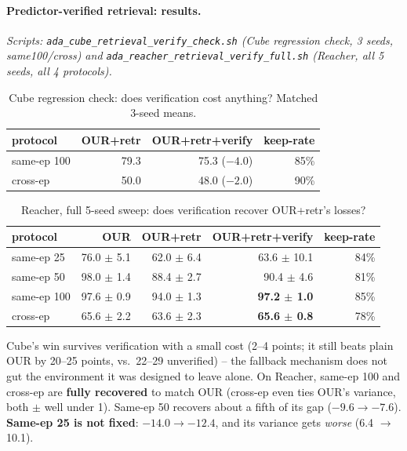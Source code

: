 \documentclass[11pt]{article}
\begin{document}
\paragraph{Predictor-verified retrieval: results.} \emph{Scripts:
\texttt{ada\_cube\_retrieval\_verify\_check.sh} (Cube regression check, 3 seeds, same100/cross)
and \texttt{ada\_reacher\_retrieval\_verify\_full.sh} (Reacher, all 5 seeds, all 4 protocols).}

\begin{table}[H]
\centering\small
\caption{Cube regression check: does verification cost anything? Matched 3-seed means.}
\begin{tabular}{lrrr}
\toprule
protocol & OUR+retr & OUR+retr+verify & keep-rate \\
\midrule
same-ep 100 & 79.3 & 75.3 ($-4.0$) & 85\% \\
cross-ep    & 50.0 & 48.0 ($-2.0$) & 90\% \\
\bottomrule
\end{tabular}
\end{table}

\begin{table}[H]
\centering\small
\caption{Reacher, full 5-seed sweep: does verification recover OUR+retr's losses?}
\label{tab:retrieval-verify-reacher}
\begin{tabular}{lrrrr}
\toprule
protocol & OUR & OUR+retr & OUR+retr+verify & keep-rate \\
\midrule
same-ep 25  & 76.0 $\pm$ 5.1 & 62.0 $\pm$ 6.4 & 63.6 $\pm$ 10.1 & 84\% \\
same-ep 50  & 98.0 $\pm$ 1.4 & 88.4 $\pm$ 2.7 & 90.4 $\pm$ 4.6  & 81\% \\
same-ep 100 & 97.6 $\pm$ 0.9 & 94.0 $\pm$ 1.3 & \textbf{97.2 $\pm$ 1.0}  & 85\% \\
cross-ep    & 65.6 $\pm$ 2.2 & 63.6 $\pm$ 2.3 & \textbf{65.6 $\pm$ 0.8}  & 78\% \\
\bottomrule
\end{tabular}
\end{table}

Cube's win survives verification with a small cost (2--4 points; it still beats plain OUR by
20--25 points, vs.\ 22--29 unverified) -- the fallback mechanism does not gut the environment it
was designed to leave alone. On Reacher, same-ep 100 and cross-ep are \textbf{fully recovered}
to match OUR (cross-ep even ties OUR's variance, both $\pm$ well under 1). Same-ep 50 recovers
about a fifth of its gap ($-9.6\to-7.6$). \textbf{Same-ep 25 is not fixed}: $-14.0\to-12.4$, and
its variance gets \emph{worse} (6.4 $\to$ 10.1).
\end{document}
